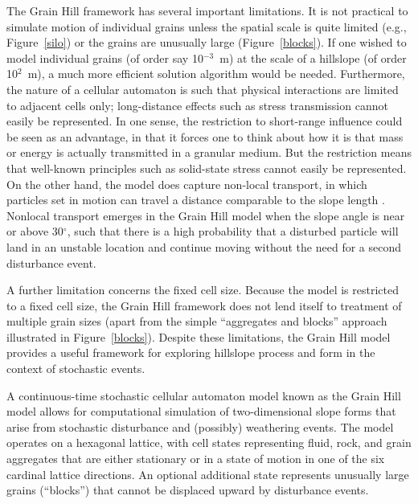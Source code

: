 \documentclass[esurf, manuscript]{copernicus}
\begin{document}
The Grain Hill framework has several important limitations. It is not practical to simulate motion of individual grains unless the spatial scale is quite limited (e.g., Figure~\ref{silo}) or the grains are unusually large (Figure~\ref{blocks}). If one wished to model individual grains (of order say 10$^{-3}$~m) at the scale of a hillslope (of order 10$^2$~m), a much more efficient solution algorithm would be needed. Furthermore, the nature of a cellular automaton is such that physical interactions are limited to adjacent cells only; long-distance effects such as stress transmission cannot easily be represented. In one sense, the restriction to short-range influence could be seen as an advantage, in that it forces one to think about how it is that mass or energy is actually transmitted in a granular medium. But the restriction means that well-known principles such as solid-state stress cannot easily be represented. On the other hand, the model does capture non-local transport, in which particles set in motion can travel a distance comparable to the slope length \citep{foufoula2010nonlocal,tucker2010trouble,furbish2013sediment}. Nonlocal transport emerges in the Grain Hill model when the slope angle is near or above 30$^\circ$, such that there is a high probability that a disturbed particle will land in an unstable location and continue moving without the need for a second disturbance event.

A further limitation concerns the fixed cell size. Because the model is restricted to a fixed cell size, the Grain Hill framework does not lend itself to treatment of multiple grain sizes (apart from the simple ``aggregates and blocks'' approach illustrated in Figure~\ref{blocks}). Despite these limitations, the Grain Hill model provides a useful framework for exploring hillslope process and form in the context of stochastic events.



\conclusions  %

A continuous-time stochastic cellular automaton model known as the Grain Hill model allows for computational simulation of two-dimensional slope forms that arise from stochastic disturbance and (possibly) weathering events. The model operates on a hexagonal lattice, with cell states representing fluid, rock, and grain aggregates that are either stationary or in a state of motion in one of the six cardinal lattice directions. An optional additional state represents unusually large grains (``blocks'') that cannot be displaced upward by disturbance events. 
\end{document}
